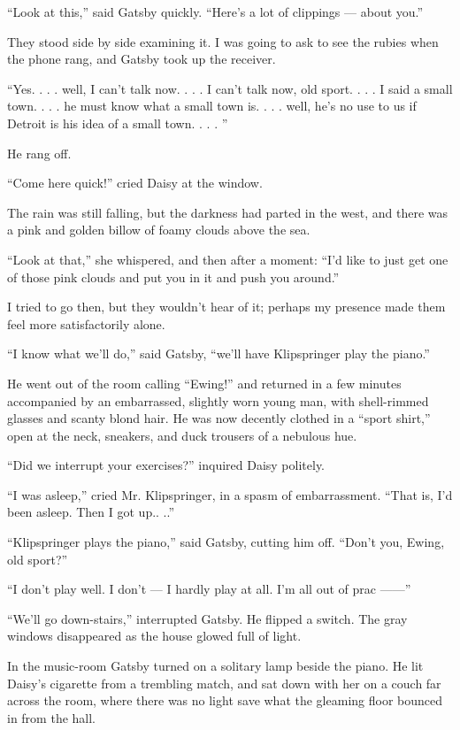 \documentclass{znotebook}
\begin{document}
``Look at this,'' said Gatsby quickly. ``Here's a lot of clippings — about you.''

They stood side by side examining it. I was going to ask to see the rubies when the phone rang, and Gatsby took up the receiver.

``Yes. . . . well, I can't talk now. . . . I can't talk now, old sport. . . . I said a small town. . . . he must know what a small town is. . . . well, he's no use to us if Detroit is his idea of a small town. . . . ''

He rang off.

``Come here quick!'' cried Daisy at the window.

The rain was still falling, but the darkness had parted in the west, and there was a pink and golden billow of foamy clouds above the sea.

``Look at that,'' she whispered, and then after a moment: ``I'd like to just get one of those pink clouds and put you in it and push you around.''

I tried to go then, but they wouldn't hear of it; perhaps my presence made them feel more satisfactorily alone.

``I know what we'll do,'' said Gatsby, ``we'll have Klipspringer play the piano.''

He went out of the room calling ``Ewing!'' and returned in a few minutes accompanied by an embarrassed, slightly worn young man, with shell-rimmed glasses and scanty blond hair. He was now decently clothed in a ``sport shirt,'' open at the neck, sneakers, and duck trousers of a nebulous hue.

``Did we interrupt your exercises?'' inquired Daisy politely.

``I was asleep,'' cried Mr. Klipspringer, in a spasm of embarrassment. ``That is, I'd been asleep. Then I got up.. ..''

``Klipspringer plays the piano,'' said Gatsby, cutting him off. ``Don't you, Ewing, old sport?''

``I don't play well. I don't — I hardly play at all. I'm all out of prac ——''

``We'll go down-stairs,'' interrupted Gatsby. He flipped a switch. The gray windows disappeared as the house glowed full of light.

In the music-room Gatsby turned on a solitary lamp beside the piano. He lit Daisy's cigarette from a trembling match, and sat down with her on a couch far across the room, where there was no light save what the gleaming floor bounced in from the hall.
\end{document}
